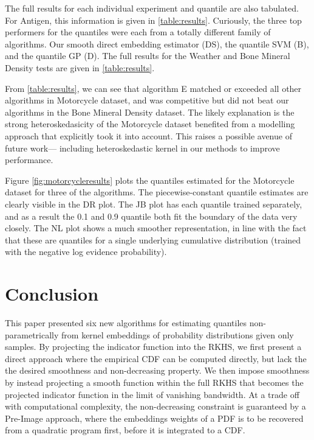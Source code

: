 \documentclass[twoside]{article} \usepackage{aistats2017}
\theoremstyle{definition}
\theoremstyle{theorem}
\begin{document}
		The full results for each individual experiment and quantile are also tabulated. For Antigen, this information is given in \cref{table:results}. Curiously, the three top performers for the quantiles were each from a totally different family of algorithms. Our smooth direct embedding estimator (DS), the quantile SVM (B), and the quantile GP (D). The full results for the Weather and Bone Mineral Density tests are given in \cref{table:results}.
		
		From \cref{table:results}, we can see that algorithm E matched or exceeded all other algorithms in Motorcycle dataset, and was competitive but did not beat our algorithms in the Bone Mineral Density dataset. The likely explanation is the strong heteroskedasicity of the Motorcycle dataset benefited from a modelling approach that explicitly took it into account. This raises a possible avenue of future work--- including heteroskedastic kernel in our methods to improve performance.
		
		Figure \ref{fig:motorcycleresults} plots the quantiles estimated for the Motorcycle dataset for three of the algorithms. The piecewise-constant quantile estimates are clearly visible in the DR plot. The JB plot has each quantile trained separately, and as a result the 0.1 and 0.9 quantile both fit the boundary of the data very closely. The NL plot shows a much smoother representation, in line with the fact that these are quantiles for a single underlying cumulative distribution (trained with the negative log evidence probability).

\section{Conclusion}
\label{sec:conclusion}
	
	This paper presented six new algorithms for estimating quantiles non-parametrically from kernel embeddings of probability distributions given only samples. By projecting the indicator function into the RKHS, we first present a direct approach where the empirical CDF can be computed directly, but lack the the desired smoothness and non-decreasing property. We then impose smoothness by instead projecting a smooth function within the full RKHS that becomes the projected indicator function in the limit of vanishing bandwidth. At a trade off with computational complexity, the non-decreasing constraint is guaranteed by a Pre-Image approach, where the embeddings weights of a PDF is to be recovered from a quadratic program first, before it is integrated to a CDF.
	
\end{document}
